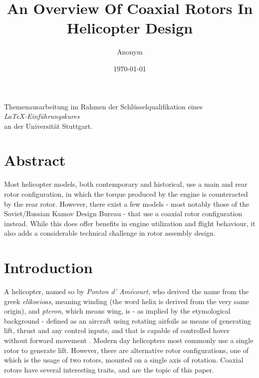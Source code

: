 \documentclass[11pt, a4paper]{scrartcl}
\title{An Overview Of Coaxial Rotors In Helicopter Design}
\author{Anonym}
\date{\today}
\begin{document}
\maketitle

\begin{center}
    Themenausarbeitung im Rahmen der Schlüsselqualifikation eines\\ \emph{\LaTeX-Einführungskures}\\ an der Universität Stuttgart.
    \vspace{1cm}\\
\end{center}

\tableofcontents

\section{Abstract\label{Abstract}}
Most helicopter models, both contemporary and historical, use a main and rear rotor configuration, in which the torque produced by the engine is counteracted
by the rear rotor. However, there exist a few models - most notably those of the Soviet/Russian Kamov Design Bureau - that use a coaxial rotor configuration instead. While this does offer benefits in engine utilization and flight behaviour, it also adds a considerable technical challenge in rotor assembly design.

\section{Introduction\label{Introduction}}
A helicopter, named so by \emph{Ponton d' Amécourt}, who derived the name from the greek \emph{elikoeioas}, meaning winding (the word helix is derived from the very same origin), and \emph{pteron}, which means wing, is - as implied by the etymological background - defined as an aircraft using rotating airfoils as means of generating lift, thrust and any control inputs, and that is capable of controlled hover without forward movement \cite{leishman-2000}. Modern day helicopters most commonly use a single rotor to generate lift. However, there are alternative rotor configurations, one of which is the usage of two rotors, mounted on a single axis of rotation. Coaxial rotors have several interesting traits, and are the topic of this paper.
\end{document}

